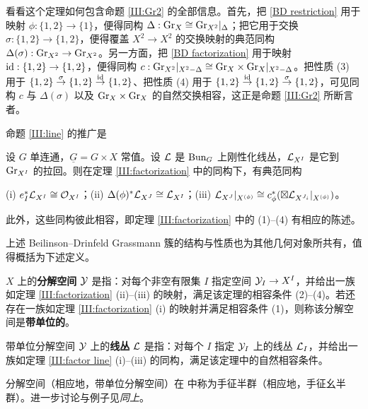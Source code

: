 \begin{ex}\label{FA ex}
看看这个定理如何包含命题 \ref{III:Gr2} 的全部信息。首先，把 \eqref{BD restriction} 用于映射 $\phi:\{1,2\}\to \{1\}$，便得同构 $\Delta: {\operatorname{Gr}}_X\cong {\operatorname{Gr}}_{X^2}|_{\Delta}$；把它用于交换 $\sigma:\{1,2\}\to \{1,2\}$，便得覆盖 $X^2\to X^2$ 的交换映射的典范同构 $\Delta(\sigma):{\operatorname{Gr}}_{X^2}\to {\operatorname{Gr}}_{X^2}$。另一方面，把 \eqref{BD factorization} 用于映射 ${\operatorname{id}}: \{1,2\}\to \{1,2\}$，便得同构 $c:{\operatorname{Gr}}_{X^2}|_{X^2-\Delta}\cong {\operatorname{Gr}}_X\times{\operatorname{Gr}}_X|_{X^2-\Delta}$。把性质 (3) 用于 $\{1,2\}\stackrel{\sigma}{\to}\{1,2\}\stackrel{{\operatorname{id}}}{\to}\{1,2\}$、把性质 (4) 用于 $\{1,2\}\stackrel{{\operatorname{id}}}{\to}\{1,2\}\stackrel{\sigma}{\to}\{1,2\}$，可见同构 $c$ 与 $\Delta(\sigma)$ 以及 ${\operatorname{Gr}}_{X}\times{\operatorname{Gr}}_X$ 的自然交换相容，这正是命题 \ref{III:Gr2} 所断言者。
\end{ex}

命题 \ref{III:line} 的推广是

\begin{thm}\label{III:factor line}
设 $G$ 单连通，$\underline G=G\times X$ 常值。设 ${\mathcal L}$ 是 ${\operatorname{Bun}}_{G}$ 上刚性化线丛，${\mathcal L}_{X^I}$ 是它到 ${\operatorname{Gr}}_{X^I}$ 的拉回。则在定理 \ref{III:factorization} 中的同构下，有典范同构

(i) $e_I^*{\mathcal L}_{X^I}\cong {\mathcal O}_{X^I}$；(ii) $\Delta(\phi)^*{\mathcal L}_{X^J}\cong {\mathcal L}_{X^I}$；(iii) ${\mathcal L}_{X^J}|_{X^{(\phi)}}\cong c_\phi^*(\boxtimes {\mathcal L}_{X^{J_i}}|_{X^{(\phi)}})$。

此外，这些同构彼此相容，即定理 \ref{III:factorization} 中的 (1)--(4) 有相应的陈述。
\end{thm}

上述 Beilinson--Drinfeld Grassmann 簇的结构与性质也为其他几何对象所共有，值得概括为下述定义。

\begin{dfn}\label{FA space}
$X$ 上的\textbf{分解空间} ${\mathcal Y}$ 是指：对每个非空有限集 $I$ 指定空间 ${\mathcal Y}_I\to X^I$，并给出一族如定理 \ref{III:factorization} (ii)--(iii) 的映射，满足该定理的相容条件 (2)--(4)。若还存在一族如定理 \ref{III:factorization} (i) 的映射并满足相容条件 (1)，则称该分解空间是\textbf{带单位的}。

带单位分解空间 ${\mathcal Y}$ 上的\textbf{线丛} ${\mathcal L}$ 是指：对每个 $I$ 指定 ${\mathcal Y}_I$ 上的线丛 ${\mathcal L}_I$，并给出一族如定理 \ref{III:factor line} (i)--(iii) 的同构，满足该定理中的自然相容条件。
\end{dfn}

\begin{rmk}
分解空间（相应地，带单位分解空间）在 \cite[\S\ 3.10.16]{BD0} 中称为手征半群（相应地，手征幺半群）。进一步讨论与例子见\emph{同上}。
\end{rmk}

